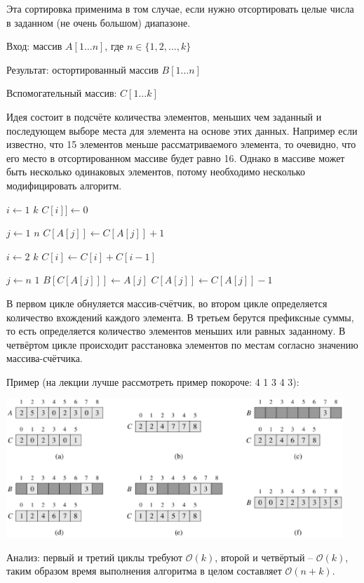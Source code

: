 \documentclass[a4paper,11pt]{article}
\begin{document}
Эта сортировка применима в том случае, если нужно отсортировать целые числа в
заданном (не очень большом) диапазоне.

Вход: массив $A[1 \ldots n]$, где $n \in \lbrace 1, 2, \ldots, k \rbrace$

Результат: остортированный массив $B[1 \ldots n]$

Вспомогательный массив: $C[1 \ldots k]$

Идея состоит в подсчёте количества элементов, меньших чем заданный и последующем
выборе места для элемента на основе этих данных. Например если известно, что 15
элементов меньше рассматриваемого элемента, то очевидно, что его место в
отсортированном массиве будет равно 16. Однако в массиве может быть несколько
одинаковых элементов, потому необходимо несколько модифицировать алгоритм.

\begin{codebox}
\li \For $i \gets 1 $ \To $k$
\li      \Do $C[i]] \gets 0$ \End
   
\li \For $j \gets 1 $ \To $n$
\li      \Do $C[A[j]] \gets C[A[j]] + 1$ \End
 
\li \For $i \gets 2 $ \To $k$
\li      \Do $C[i] \gets C[i] + C[i-1]$ \End

\li \For $j \gets n $ \Downto $1$
\li      \Do $B[C[A[j]]] \gets A[j]$
\li          $C[A[j]] \gets C[A[j]] - 1$
         \End
\end{codebox}

В первом цикле обнуляется массив-счётчик, во втором цикле определяется
количество вхождений каждого элемента. В третьем берутся префиксные суммы, то
есть определяется количество элементов меньших или равных заданному. В четвёртом
цикле происходит расстановка элементов по местам согласно значению массива-счётчика.

Пример (на лекции лучше рассмотреть пример покороче: 4 1 3 4 3):

\includegraphics[width=5in]{lecture5/counting-sort.eps}

Анализ: первый и третий циклы требуют $\mathcal{O}(k)$, второй и четвёртый --
$\mathcal{O}(k)$, таким образом время выполнения алгоритма в целом составляет
$\mathcal{O}(n+k)$.
\end{document}
